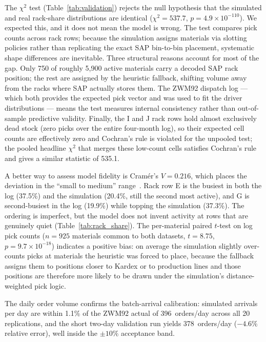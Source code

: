 

The $\chi^{2}$ test (Table~\ref{tab:validation}) rejects the null
hypothesis that the simulated and real rack-share distributions are
identical ($\chi^{2} = 537.7$, $p = 4.9 \times 10^{-110}$).  We
expected this, and it does not mean the model is wrong.  The test
compares pick counts across rack rows; because the simulation assigns
materials via slotting policies rather than replicating the exact SAP
bin-to-bin placement, systematic shape differences are inevitable.
Three structural reasons account for most of the gap.  Only 750 of
roughly 5,900 active materials carry a decoded SAP rack position; the
rest are assigned by the heuristic fallback, shifting volume away from
the racks where SAP actually stores them.  The ZWM92 dispatch log ---
which both provides the expected pick vector and was used to fit the
driver distributions --- means the test measures internal consistency
rather than out-of-sample predictive validity.  Finally, the I and J
rack rows hold almost exclusively dead stock (zero picks over the
entire four-month log), so their expected cell counts are effectively
zero and Cochran's rule is violated for the unpooled test; the pooled
headline $\chi^{2}$ that merges these low-count cells satisfies
Cochran's rule and gives a similar statistic of 535.1.

A better way to assess model fidelity is Cram\'er's $V = 0.216$, which
places the deviation in the ``small to medium'' range~\cite{bartholdi2014}.
Rack row E is the busiest in both the log (37.5\%) and the simulation
(20.4\%, still the second most active), and G is second-busiest in
the log (19.9\%) while topping the simulation (37.3\%).  The ordering
is imperfect, but the model does not invent activity at rows that are
genuinely quiet (Table~\ref{tab:rack_share}).  The per-material paired
$t$-test on log pick counts ($n = 925$ materials common to both
datasets, $t = 8.75$, $p = 9.7 \times 10^{-18}$) indicates a positive
bias: on average the simulation slightly over-counts picks at materials
the heuristic was forced to place, because the fallback assigns them to
positions closer to Kardex or to production lines and those positions
are therefore more likely to be drawn under the simulation's
distance-weighted pick logic.

The daily order volume confirms the batch-arrival calibration:
simulated arrivals per day are within 1.1\% of the ZWM92 actual of
396~orders/day across all 20 replications, and the short two-day
validation run yields 378~orders/day ($-4.6\%$ relative error), well
inside the $\pm 10\%$ acceptance band.

